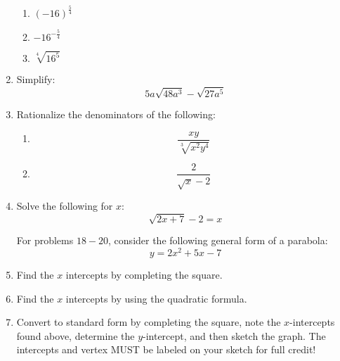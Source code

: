 \documentclass[letterpaper,12pt,fleqn]{article}
\begin{document}
\begin{enumerate}
\begin{enumerate}
  \item $(-16)^{\frac{5}{4}}$

    \vspace{0.5in}
    
  \item $-16^{-\frac{5}{4}}$

    \vspace{0.5in}
    
  \item $\sqrt[4]{16^5}$

  \end{enumerate}

  \newpage

\item Simplify:
  \[5a\sqrt{48a^3}-\sqrt{27a^5}\]

  \vspace{2.5in}

\item Rationalize the denominators of the following:
  \begin{enumerate}
  \item \[\frac{xy}{\sqrt[3]{x^2y^4}}\]

    \vspace{2.6in}

  \item \[\frac{2}{\sqrt{x}-2}\]
    
  \end{enumerate}

  \newpage

\item Solve the following for $x$:
  \[\sqrt{2x+7}-2=x\]

  \vspace{3in}
  
  For problems $18-20$, consider the following general form of a parabola:
  \[y=2x^2+5x-7\]

\item Find the $x$ intercepts by completing the square.

  \newpage

\item Find the $x$ intercepts by using the quadratic formula.

  \vspace{3in}

\item Convert to standard form by completing the square, note the
  $x$-intercepts found above, determine the $y$-intercept, and then sketch the
  graph. The intercepts and vertex MUST be labeled on your sketch for full
  credit!
\end{enumerate}
\end{document}
